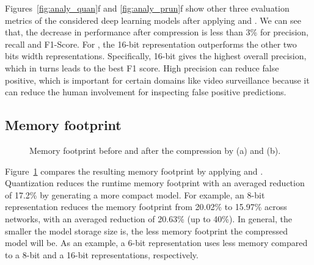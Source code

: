 Figures~\ref{fig:analy_quan}f and \ref{fig:analy_prun}f show other three evaluation metrics of the considered deep learning models after
applying \quantization and \pruning. We can see that, the decrease in performance after compression is  less than 3\% for precision, recall
and F1-Score. For \quantization, the 16-bit representation outperforms the other two bits width representations. Specifically, 16-bit gives
the highest overall precision, which in turns leads to the best F1 score. High precision can reduce false positive, which is important for
certain domains like video surveillance because it can reduce the human involvement for inspecting false positive predictions.




\subsection{Memory footprint}

\begin{figure}[!t]
\centering
{}
\hfill
{}
\hfill

\caption{Memory footprint before and after the compression by \quantization(a) and \pruning (b).}
\label{fig:footprint}
\end{figure}

Figure~\ref{fig:footprint} compares the resulting memory footprint by applying \quantization and \pruning. Quantization reduces the runtime
memory footprint with an averaged reduction of 17.2\% by generating a more compact model. For example, an 8-bit representation reduces the
memory footprint from 20.02\% to 15.97\% across networks, with an averaged reduction of 20.63\% (up to 40\%). In general, the smaller the
model storage size is, the less memory footprint the compressed model will be. As an example, a 6-bit representation uses  less memory compared to a 8-bit and a 16-bit representations, respectively.

